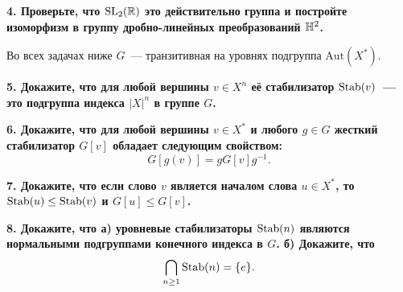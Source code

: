 \documentclass[9pt]{extarticle}
\begin{document}
\begin{landscape}
\begin{multicols}{2}
	\bf{4.} Проверьте, что $\mathrm{SL}_{2}(\mathbb{R})$ это действительно группа и постройте изоморфизм в группу дробно-линейных преобразований $\mathbb{H}^2$. 

	Во всех задачах ниже $G$~--- транзитивная на уровнях подгруппа $\mathrm{Aut}(X^*)$.

	\bf{5.}  Докажите, что для любой вершины $v \in X^n$ её стабилизатор  $\operatorname{Stab}(v)$~--- это подгруппа индекса $|X|^n$ в группе $G$. 

 	\bf{6.} Докажите, что для любой вершины $v \in X^*$ и любого $g \in G$ жесткий стабилизатор $G[v]$ обладает следующим свойством: 
 	\[
 		G[g(v)] = g G[v] g^{-1}.
 	\]

 	\bf{7.} Докажите, что если слово $v$ является началом слова $u \in X^*$, то $\operatorname{Stab}(u) \le \operatorname{Stab}(v)$ и $G[u] \le G[v]$.

 	\bf{8.} Докажите, что а) уровневые стабилизаторы $\operatorname{Stab}(n)$ являются нормальными подгруппами конечного индекса в $G$. б) Докажите, что 
 	\[
 		\bigcap_{n \ge 1} \operatorname{Stab}(n) = \{ e \}.
 	\]


 

	\end{multicols}
	\end{landscape}
\end{document}
